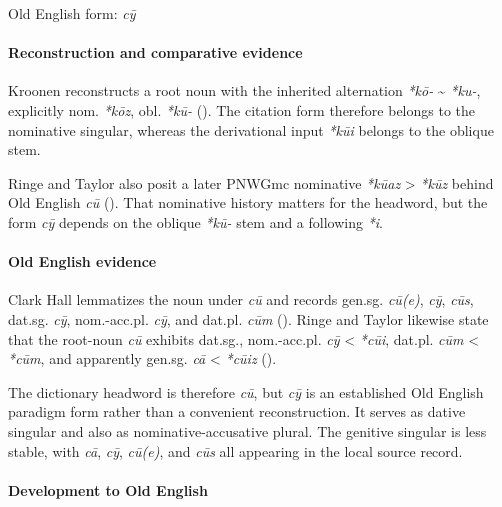 \documentclass[
  british,
  a4paper,
]{article}
\begin{document}
Old English form: \emph{cȳ}

\paragraph{Reconstruction and comparative
evidence}\label{reconstruction-and-comparative-evidence-42}

Kroonen reconstructs a root noun with the inherited alternation
\emph{*kō-} \textasciitilde{} \emph{*ku-}, explicitly nom. \emph{*kōz},
obl. \emph{*kū-} (). The
citation form therefore belongs to the nominative singular, whereas the
derivational input \emph{*kūi} belongs to the oblique stem.

Ringe and Taylor also posit a later PNWGmc nominative \emph{*kūaz}
\textgreater{} \emph{*kūz} behind Old English \emph{cū}
().
That nominative history matters for the headword, but the form \emph{cȳ}
depends on the oblique \emph{*kū-} stem and a following \emph{*i}.

\paragraph{Old English evidence}\label{old-english-evidence-42}

Clark Hall lemmatizes the noun under \emph{cū} and records gen.sg.
\emph{cū(e)}, \emph{cȳ}, \emph{cūs}, dat.sg. \emph{cȳ}, nom.-acc.pl.
\emph{cȳ}, and dat.pl. \emph{cūm} (). Ringe and Taylor likewise state that the root-noun
\emph{cū} exhibits dat.sg., nom.-acc.pl. \emph{cȳ} \textless{}
\emph{*cūi}, dat.pl. \emph{cūm} \textless{} \emph{*cūm}, and apparently
gen.sg. \emph{cā} \textless{} \emph{*cūiz}
().

The dictionary headword is therefore \emph{cū}, but \emph{cȳ} is an
established Old English paradigm form rather than a convenient
reconstruction. It serves as dative singular and also as
nominative-accusative plural. The genitive singular is less stable, with
\emph{cā}, \emph{cȳ}, \emph{cū(e)}, and \emph{cūs} all appearing in the
local source record.

\paragraph{Development to Old
English}\label{development-to-old-english-42}
\end{document}
